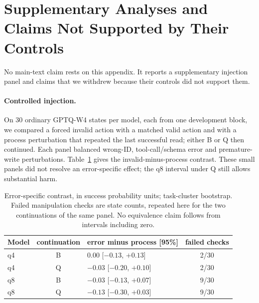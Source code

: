 \section{Supplementary Analyses and Claims Not Supported by Their Controls}
\label{app:injection}

No main-text claim rests on this appendix. It reports a supplementary injection panel and claims that we withdrew because their controls did not support them.

\paragraph{Controlled injection.} On 30 ordinary GPTQ-W4 states per model, each from one development block, we compared a forced invalid action with a matched valid action and with a process perturbation that repeated the last successful read; either B or Q then continued. Each panel balanced wrong-ID, tool-call/schema error and premature-write perturbations. Table~\ref{tab:injection-boundary} gives the invalid-minus-process contrast. These small panels did not resolve an error-specific effect; the q8 interval under Q still allows substantial harm. %

\begin{table}[t]
\centering%
\renewcommand{\arraystretch}{1.12}\fontsize{8.5}{10}\selectfont\setlength{\tabcolsep}{4pt}
\begin{tabular}{@{}lclc@{}}
\toprule
Model & continuation & error minus process [95\%] & failed checks \\
\midrule
q4 & B & $0.00$ [$-0.13$, $+0.13$] & 2/30 \\
q4 & Q & $-0.03$ [$-0.20$, $+0.10$] & 2/30 \\
q8 & B & $-0.03$ [$-0.13$, $+0.07$] & 9/30 \\
q8 & Q & $-0.13$ [$-0.30$, $+0.03$] & 9/30 \\
\bottomrule
\end{tabular}
\caption{Error-specific contrast, in success probability units; task-cluster bootstrap. Failed manipulation checks are state counts, repeated here for the two continuations of the same panel. No equivalence claim follows from intervals including zero.}
\label{tab:injection-boundary}
\end{table}

